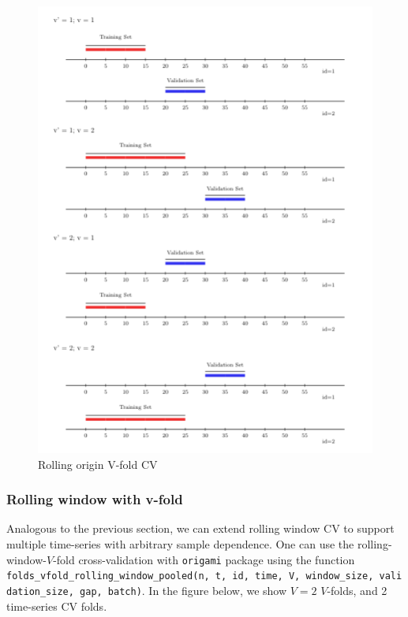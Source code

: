 \documentclass[12pt, krantz2,]{book}
\theoremstyle{definition}
\theoremstyle{definition}
\theoremstyle{definition}
\newcommand{\1}{\mathbbm{1}}
\begin{document}
\begin{figure}

{\centering \includegraphics[width=0.8\linewidth]{img/image/rolling_origin_v_fold} 

}

\caption{Rolling origin V-fold CV}\label{fig:unnamed-chunk-3}
\end{figure}

\hypertarget{rolling-window-with-v-fold}{%
\subsubsection{Rolling window with v-fold}\label{rolling-window-with-v-fold}}

Analogous to the previous section, we can extend rolling window CV to support
multiple time-series with arbitrary sample dependence. One can use the
rolling-window-\(V\)-fold cross-validation with \texttt{origami} package using the
function \texttt{folds\_vfold\_rolling\_window\_pooled(n,\ t,\ id,\ time,\ V,\ window\_size,\ validation\_size,\ gap,\ batch)}. In the figure below, we show \(V=2\) \(V\)-folds, and
2 time-series CV folds.
\end{document}
